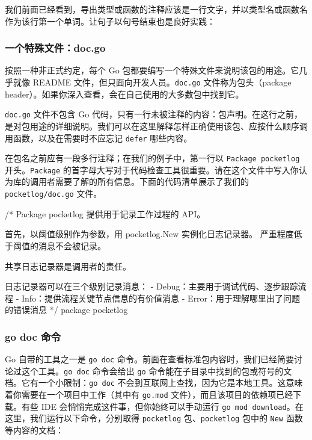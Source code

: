 我们前面已经看到，导出类型或函数的注释应该是一行文字，并以类型名或函数名作为该行第一个单词。让句子以句号结束也是良好实践：

\begin{gocode}[]
// New 返回一个日志记录器，可按所需阈值开始记录日志。
func New(level Level) *Logger {
\end{gocode}

\subsubsection*{一个特殊文件：doc.go}
按照一种非正式约定，每个 Go 包都要编写一个特殊文件来说明该包的用途。它几乎就像 README 文件，但只面向开发人员。\texttt{doc.go} 文件称为包头（package header）。如果你深入查看，会在自己使用的大多数包中找到它。

\texttt{doc.go} 文件不包含 Go 代码，只有一行未被注释的内容：包声明。在这行之前，是对包用途的详细说明。我们可以在这里解释怎样正确使用该包、应按什么顺序调用函数，以及在需要时不应忘记 \texttt{defer} 哪些内容。

在包名之前应有一段多行注释；在我们的例子中，第一行以 \texttt{Package pocketlog} 开头。\texttt{Package} 的首字母大写对于代码检查工具很重要。请在这个文件中写入你认为库的调用者需要了解的所有信息。下面的代码清单展示了我们的 \texttt{pocketlog/doc.go} 文件。
\begin{gocode}[title={代码清单 4.5 doc.go：为包编写文档}]
/*
Package pocketlog 提供用于记录工作过程的 API。

首先，以阈值级别作为参数，用 pocketlog.New 实例化日志记录器。
严重程度低于阈值的消息不会被记录。

共享日志记录器是调用者的责任。

日志记录器可以在三个级别记录消息：
   - Debug：主要用于调试代码、逐步跟踪流程
   - Info：提供流程关键节点信息的有价值消息
   - Error：用于理解哪里出了问题的错误消息
*/
package pocketlog
\end{gocode}

\subsubsection*{go doc 命令}
Go 自带的工具之一是 \texttt{go doc} 命令。前面在查看标准包内容时，我们已经简要讨论过这个工具。\texttt{go doc} 命令会给出 \texttt{go} 命令能在子目录中找到的包或符号的文档。它有一个小限制：\texttt{go doc} 不会到互联网上查找，因为它是本地工具。这意味着你需要在一个项目中工作（其中有 \texttt{go.mod} 文件），而且该项目的依赖项已经下载。有些 IDE 会悄悄完成这件事，但你始终可以手动运行 \texttt{go mod download}。在这里，我们运行以下命令，分别取得 \texttt{pocketlog} 包、\texttt{pocketlog} 包中的 \texttt{New} 函数等内容的文档：

